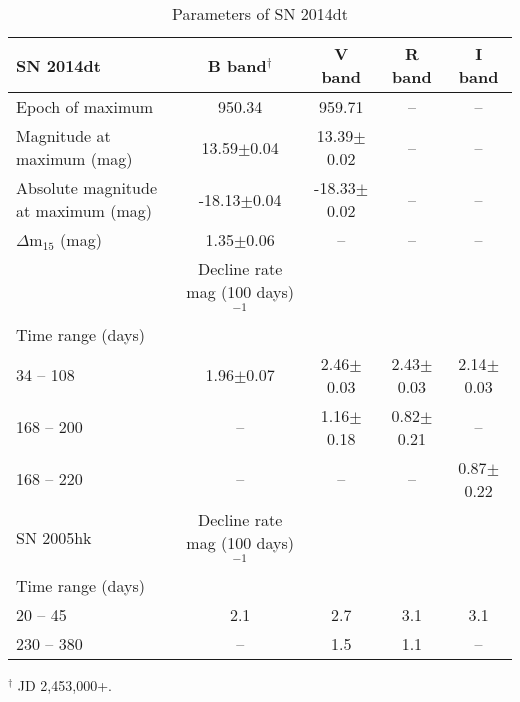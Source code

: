 \begin{table*}
\caption{ Parameters of SN 2014dt  }
\centering
\smallskip
\begin{tabular}{l  c c c c}
\hline \hline
SN 2014dt                                                  & B band$^\dagger$ & V band            & R band           & I band            \\
\hline
Epoch of maximum                                           & 950.34           & 959.71            & --               & --                 \\
Magnitude at maximum (mag)                                 & 13.59$\pm$0.04 & 13.39$\pm$0.02      & --               & --                  \\
Absolute magnitude at maximum (mag)                        & -18.13$\pm$0.04 & -18.33$\pm$0.02      & --               & --                  \\
$\Delta$m$_{15}$ (mag)                                     & 1.35$\pm$0.06    & --                & --               & --   	       \\
\hline
&Decline rate mag (100 days)$^{-1}$     &   &     &    \\
\hline
Time range (days)     &   &     &     &    \\
\hline
34 -- 108 & 1.96$\pm$0.07     & 2.46$\pm$0.03     & 2.43$\pm$0.03    & 2.14$\pm$0.03    \\
168 -- 200 & --               & 1.16$\pm$0.18     & 0.82$\pm$0.21    & --    \\
168 -- 220 & --               & --                & --               & 0.87$\pm$0.22    \\
\hline
\hline
SN 2005hk &Decline rate mag (100 days)$^{-1}$    &    &     &    \\
\hline
Time range (days)     &   &     &     &    \\
\hline
20 -- 45    & 2.1              & 2.7               & 3.1              & 3.1\\
230 -- 380  & --               & 1.5               & 1.1              & --\\
\hline
\end{tabular}
\newline
$^\dagger$ JD 2,453,000+.
\label{tab:decay rate}      
\end{table*}
